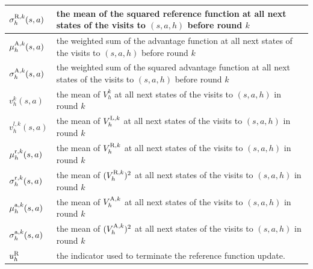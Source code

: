 \documentclass{article}
\newcommand{\LL}{\textnormal{L}}
\newcommand{\R}{\textnormal{R}}
\newcommand{\nr}{\textnormal{r}}
\newcommand{\A}{\textnormal{A}}
\newcommand{\na}{\textnormal{a}}
\begin{document}
\begin{table}[ht]
\begin{tabular}{|>{\centering\arraybackslash}m{1.5cm}|m{11.5cm}|}
$\sigma_h^{\R,k}(s,a)$ &  the mean of the squared reference function at all next states of the visits to $(s,a,h)$ before round $k$\\ \hline
$\mu_h^{\A,k}(s,a)$ &  the weighted sum of the advantage function at all next states of the visits to $(s,a,h)$ before round $k$\\ \hline
$\sigma_h^{\A,k}(s,a)$ &  the weighted sum of the squared advantage function at all next states of the visits to $(s,a,h)$ before round $k$\\ \hline
$v_h^k(s,a)$ &  the mean of $V_h^k$ at all next states of the visits to $(s,a,h)$ in round $k$\\ \hline
$v_h^{l,k}(s,a)$ &  the mean of $V_h^{\LL,k}$ at all next states of the visits to $(s,a,h)$ in round $k$\\ \hline
$\mu_h^{\nr,k}(s,a)$ &  the mean of $V_h^{\R,k}$ at all next states of the visits to $(s,a,h)$ in round $k$\\ \hline
$\sigma_h^{\nr,k}(s,a)$ &  the mean of $(V_h^{\R,k})^2$ at all next states of the visits to $(s,a,h)$ in round $k$\\ \hline
$\mu_h^{\na,k}(s,a)$ &  the mean of $V_h^{\A,k}$ at all next states of the visits to $(s,a,h)$ in round $k$\\ \hline
$\sigma_h^{\na,k}(s,a)$ &  the mean of $(V_h^{\A,k})^2$ at all next states of the visits to $(s,a,h)$ in round $k$\\ \hline
$u_h^{\R}$ &  the indicator used to terminate the reference function update.\\ \hline
\end{tabular}
\end{table}
\end{document}
